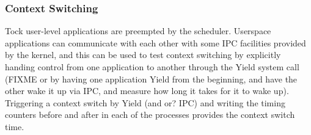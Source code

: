 \documentclass{article}
\begin{document}
\subsubsection{Context Switching}

Tock user-level applications are preempted by the scheduler. Userspace applications can communicate with each other with some IPC facilities provided by the kernel, and this can be used to test context switching by explicitly handing control from one application to another through the Yield system call (FIXME or by having one application Yield from the beginning, and have the other wake it up via IPC, and measure how long it takes for it to wake up). Triggering a context switch by Yield (and or? IPC) and writing the timing counters before and after in each of the processes provides the context switch time. 





\end{document}

